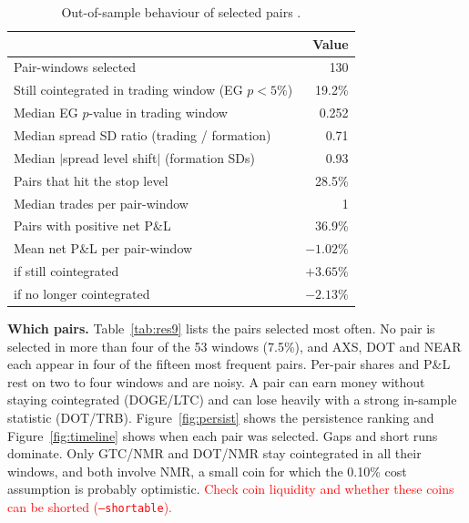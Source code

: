\documentclass[10pt,a4paper,twocolumn]{article}
\newcommand{\TBD}[1]{\textcolor{red}{#1}}
\begin{document}
\begin{table}[htbp]
	\centering
	\small
	\caption{Out-of-sample behaviour of selected pairs .}
	\label{tab:res8}
	\begin{tabularx}{\columnwidth}{@{}Xr@{}}
		\toprule
		& Value \\
		\midrule
		Pair-windows selected & 130 \\
		Still cointegrated in trading window (EG $p<5\%$) & 19.2\% \\
		Median EG $p$-value in trading window & 0.252 \\
		Median spread SD ratio (trading / formation) & 0.71 \\
		Median $|$spread level shift$|$ (formation SDs) & 0.93 \\
		Pairs that hit the stop level & 28.5\% \\
		Median trades per pair-window & 1 \\
		Pairs with positive net P\&L & 36.9\% \\
		Mean net P\&L per pair-window & $-1.02\%$ \\
		\quad if still cointegrated & $+3.65\%$ \\
		\quad if no longer cointegrated & $-2.13\%$ \\
		\bottomrule
	\end{tabularx}
\end{table}

\textbf{Which pairs.} Table~\ref{tab:res9} lists the pairs selected most often. No pair is selected in more than four of the 53 windows (7.5\%), and AXS, DOT and NEAR each appear in four of the fifteen most frequent pairs. Per-pair shares and P\&L rest on two to four windows and are noisy. A pair can earn money without staying cointegrated (DOGE/LTC) and can lose heavily with a strong in-sample statistic (DOT/TRB). Figure~\ref{fig:persist} shows the persistence ranking and Figure~\ref{fig:timeline} shows when each pair was selected. Gaps and short runs dominate. Only GTC/NMR and DOT/NMR stay cointegrated in all their windows, and both involve NMR, a small coin for which the 0.10\% cost assumption is probably optimistic. \TBD{Check coin liquidity and whether these coins can be shorted (\texttt{--shortable}).}
\end{document}
